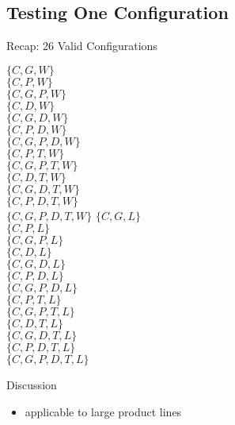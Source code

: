 \newcommand{\eemph}[1]{{\color{red}\textbf{#1}}}

\subsection{Testing One Configuration}
\begin{frame}[b]{\myframetitle{}}
	\begin{mycolumns}[b]
		\centering\featureDiagramConfigurableDatabase
		
		\begin{example}{Recap: 26 Valid Configurations\mysource{\lecturemodeling}}
			\footnotesize
			\begin{mycolumns}[animation=none]
				$\{C,G,W\}$\\
				$\{C,P,W\}$\\
				$\{C,G,P,W\}$\\
				$\{C,D,W\}$\\
				$\{C,G,D,W\}$\\
				$\{C,P,D,W\}$\\
				$\{C,G,P,D,W\}$\\
				$\{C,P,T,W\}$\\
				$\{C,G,P,T,W\}$\\
				$\{C,D,T,W\}$\\
				$\{C,G,D,T,W\}$\\
				$\{C,P,D,T,W\}$\\
				\emph{$\{C,G,P,D,T,W\}$}
			\mynextcolumn
				$\{C,G,L\}$\\
				$\{C,P,L\}$\\
				$\{C,G,P,L\}$\\
				$\{C,D,L\}$\\
				$\{C,G,D,L\}$\\
				$\{C,P,D,L\}$\\
				$\{C,G,P,D,L\}$\\
				$\{C,P,T,L\}$\\
				$\{C,G,P,T,L\}$\\
				$\{C,D,T,L\}$\\
				$\{C,G,D,T,L\}$\\
				$\{C,P,D,T,L\}$\\
				$\{C,G,P,D,T,L\}$
			\end{mycolumns}
		\end{example}
	\mynextcolumn
		\pause\vspace{-10mm}
		\begin{note}{Discussion}
			\begin{itemize}
				\setlength\itemsep{.4em}
				\item applicable to large product lines

\end{itemize}
\end{note}
\end{mycolumns}
\end{frame}
